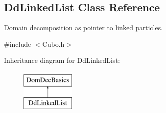 \hypertarget{classDdLinkedList}{\subsection{\-Dd\-Linked\-List \-Class \-Reference}
\label{classDdLinkedList}
}


\-Domain decomposition as pointer to linked particles.  




{\ttfamily \#include $<$\-Cubo.\-h$>$}

\-Inheritance diagram for \-Dd\-Linked\-List\-:\begin{figure}[H]
\begin{center}
\leavevmode
\includegraphics[height=2.000000cm]{classDdLinkedList}
\end{center}
\end{figure}
